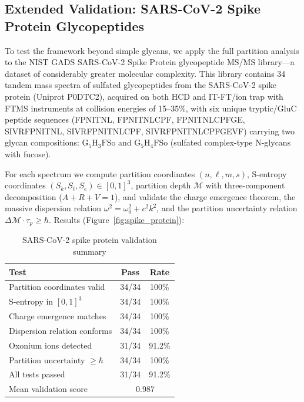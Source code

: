 \documentclass[twocolumn,10pt,a4paper]{article}
\theoremstyle{definition}
\theoremstyle{remark}
\newcommand{\Depth}{\mathcal{M}}
\newcommand{\taup}{\tau_p}
\begin{document}
\subsection{Extended Validation: SARS-CoV-2 Spike Protein Glycopeptides}
\label{sec:spike}

To test the framework beyond simple glycans, we apply the full partition analysis to the NIST GADS SARS-CoV-2 Spike Protein glycopeptide MS/MS library---a dataset of considerably greater molecular complexity. This library contains 34 tandem mass spectra of sulfated glycopeptides from the SARS-CoV-2 spike protein (Uniprot P0DTC2), acquired on both HCD and IT-FT/ion trap with FTMS instruments at collision energies of 15--35\%, with six unique tryptic/GluC peptide sequences (FPNITNL, FPNITNLCPF, FPNITNLCPFGE, SIVRFPNITNL, SIVRFPNITNLCPF, SIVRFPNITNLCPFGEVF) carrying two glycan compositions: $\text{G}_5\text{H}_3\text{F}\text{So}$ and $\text{G}_5\text{H}_4\text{F}\text{So}$ (sulfated complex-type N-glycans with fucose).

For each spectrum we compute partition coordinates $(n, \ell, m, s)$, S-entropy coordinates $(S_k, S_t, S_e) \in [0,1]^3$, partition depth $\Depth$ with three-component decomposition ($A + R + V = 1$), and validate the charge emergence theorem, the massive dispersion relation $\omega^2 = \omega_0^2 + c^2k^2$, and the partition uncertainty relation $\Delta\Depth \cdot \taup \geq \hbar$. Results (Figure~\ref{fig:spike_protein}):

\begin{table}[H]
\centering
\caption{SARS-CoV-2 spike protein validation summary}
\label{tab:spike}
\small
\begin{tabular}{lcc}
\toprule
\textbf{Test} & \textbf{Pass} & \textbf{Rate} \\
\midrule
Partition coordinates valid & 34/34 & 100\% \\
S-entropy in $[0,1]^3$ & 34/34 & 100\% \\
Charge emergence matches & 34/34 & 100\% \\
Dispersion relation conforms & 34/34 & 100\% \\
Oxonium ions detected & 31/34 & 91.2\% \\
Partition uncertainty $\geq \hbar$ & 34/34 & 100\% \\
\midrule
All tests passed & 31/34 & 91.2\% \\
Mean validation score & \multicolumn{2}{c}{0.987} \\
\bottomrule
\end{tabular}
\end{table}
\end{document}
